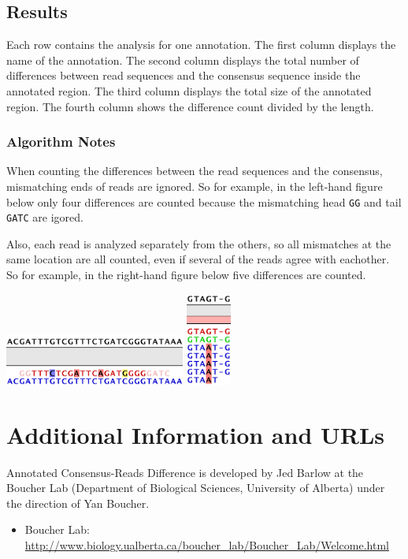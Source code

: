 \documentclass[12pt,letterpaper]{article}
\begin{document}
\subsection{Results}

Each row contains the analysis for one annotation.  The first column displays
the name of the annotation.  The second column displays the total number of
differences between read sequences and the consensus sequence inside the
annotated region.  The third column displays the total size of the annotated
region.  The fourth column shows the difference count divided by the length.

\subsubsection{Algorithm Notes}

When counting the differences between the read sequences and the consensus,
mismatching ends of reads are ignored.  So for example, in the left-hand figure
below only four differences are counted because the mismatching head
\texttt{GG} and tail \texttt{GATC} are igored.

Also, each read is analyzed separately from the others, so all mismatches at
the same location are all counted, even if several of the reads agree with
eachother. So for example, in the right-hand figure below five differences are
counted.

\begin{center}
    \includegraphics[width=16em]{mismatch_ends_ignored.png}
    \quad
    \includegraphics[width=4em]{repeats_all_counted.png}
\end{center}

\section{Additional Information and URLs}

Annotated Consensus-Reads Difference is developed by Jed Barlow at the Boucher
Lab (Department of Biological Sciences, University of Alberta) under the
direction of Yan Boucher.

\begin{itemize}
    \item
        Boucher Lab: \url{http://www.biology.ualberta.ca/boucher\_lab/Boucher\_Lab/Welcome.html}
\end{itemize}
\end{document}

